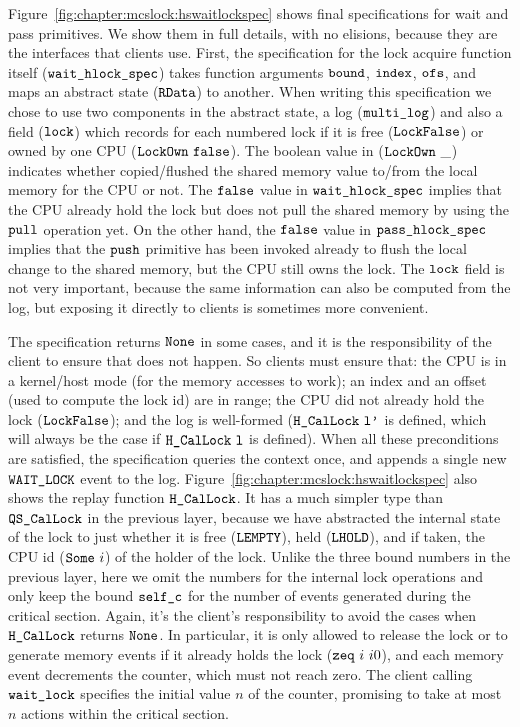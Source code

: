 Figure~\ref{fig:chapter:mcslock:hswaitlockspec} shows  final specifications for 
wait and pass primitives. We show them in full details, with no elisions,
because they are the interfaces that clients use. First, the
specification for the lock acquire function itself
(${\mathrm{\texttt{wait\_hlock\_spec}}}$) takes  function arguments
${\mathrm{\texttt{bound}}}$, ${\mathrm{\texttt{index}}}$, ${\mathrm{\texttt{ofs}}}$, and maps an
abstract state (${\mathrm{\texttt{RData}}}$) to another. When writing this
specification we chose to use two components in the abstract state, a
log (${\mathrm{\texttt{multi\_log}}}$) and also a field (${\mathrm{\texttt{lock}}}$) which
records for each numbered lock if it is free (${\mathrm{\texttt{LockFalse}}}$)
or owned by one CPU (${\mathrm{\texttt{LockOwn}}} \ {{\mathrm{\texttt{false}}}}$). 
The boolean value in (${\mathrm{\texttt{LockOwn}}}\ \_$) indicates whether copied/flushed the shared memory value to/from the local memory for the CPU or not.
The ${{\mathrm{\texttt{false}}}}$ value in ${\mathrm{\texttt{wait\_hlock\_spec}}}$ implies that the CPU already hold the lock but does not pull the shared memory by using the ${\mathrm{\texttt{pull}}}$ operation yet. 
On the other hand, the  ${{\mathrm{\texttt{false}}}}$ value   in ${\mathrm{\texttt{pass\_hlock\_spec}}}$ implies that the ${\mathrm{\texttt{push}}}$ primitive has been invoked already 
to flush the local change to the shared memory, but the CPU still owns the lock.
The ${\mathrm{\texttt{lock}}}$ field is
not very important, because the same information can also be computed
from the log, but exposing it directly to clients is sometimes more
convenient.

The specification returns ${\mathrm{\texttt{None}}}$ in some
cases, and it is the
responsibility of the client to ensure  that does not
happen. So clients must ensure that: the CPU is in a kernel/host
mode (for the memory accesses to work); an index and an offset (used to
compute the lock id) are in range; the CPU did not already hold the
lock (${\mathrm{\texttt{LockFalse}}}$); and the log is well-formed
($\HCalLock\ \codeinmath{l'}$ is defined, which will always be the case if
${\mathrm{\texttt{H\_CalLock}}}\ {\mathrm{\texttt{l}}}$ is defined).  When all these preconditions are
satisfied, the specification queries the context once, and appends a
single new ${\mathrm{\texttt{WAIT\_LOCK}}}$ event to the log.
Figure~\ref{fig:chapter:mcslock:hswaitlockspec} also shows the replay function
${\mathrm{\texttt{H\_CalLock}}}$.
It has a much simpler type than ${\mathrm{\texttt{QS\_CalLock}}}$ in the
previous layer, because we have abstracted the internal state of the lock
to just whether it is free (${\mathrm{\texttt{LEMPTY}}}$),
held (${\mathrm{\texttt{LHOLD}}}$), and if taken, the CPU id (${\mathrm{\texttt{Some}}}\ i$)
of the holder of the lock. Unlike the three bound numbers in the
previous layer, here we omit the numbers for the internal lock
operations and only keep the bound ${\mathrm{\texttt{self\_c}}}$ for the number
of events generated during the critical section. Again, it's the
client's responsibility to avoid the cases when ${\mathrm{\texttt{H\_CalLock}}}$
returns ${\mathrm{\texttt{None}}}$. In particular, it is only allowed to release
the lock or to generate memory events if it already holds the lock
(${\mathrm{\texttt{zeq}}} \ {i} \ {i0}$), and each memory event decrements the counter,
which must not reach zero. The client calling ${\mathrm{\texttt{wait\_lock}}}$
specifies the initial value $n$ of the counter, promising to take at
most $n$ actions within the critical section.


